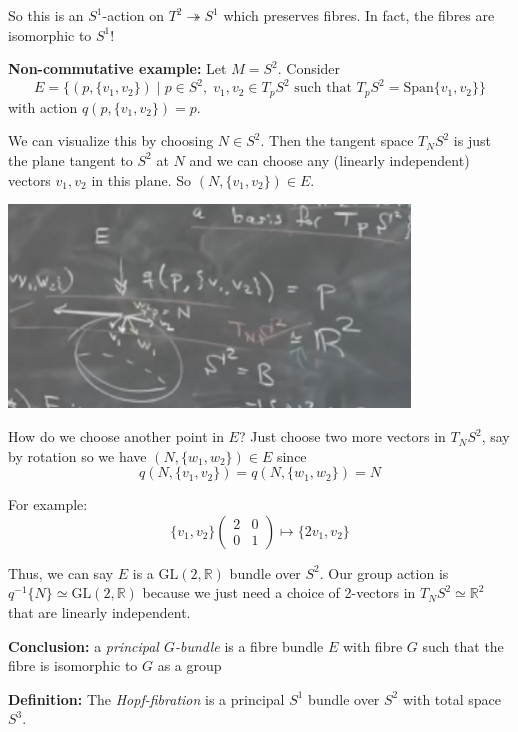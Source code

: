 \documentclass[12pt]{article}
\newcommand{\R}{\mathbb{R}}
\newcommand{\GL}{\text{GL}}
\begin{document}
    So this is an $S^1$-action on $T^2 \twoheadrightarrow S^1$ which preserves fibres. In fact, the fibres are isomorphic to $S^1$! 

    \textbf{Non-commutative example:} Let $M = S^2$. Consider 
    \[E = \{(p, \{v_1, v_2\}) \; | \; p \in S^2, \; v_1, v_2 \in T_p S^2 \text{ such that } T_p S^2 = \text{Span}\{v_1, v_2\}\}\] 
    with action $q(p, \{v_1, v_2\}) = p$. 

    We can visualize this by choosing $N \in S^2$. Then the tangent space $T_NS^2$ is just the plane tangent to $S^2$ at $N$ and we can choose any (linearly independent) vectors $v_1, v_2$ in this plane. So $(N, \{v_1, v_2\}) \in E$. 


    \begin{center}
        \includegraphics[width=0.8\textwidth]{Images/April 17 - Noncommutative manifold}
    \end{center}

    How do we choose another point in $E$? Just choose two more vectors in $T_{N}S^2$, say by rotation so we have $(N, \{w_1, w_2\}) \in E$ since 
    \[q(N, \{v_1, v_2\}) = q(N, \{w_1, w_2\}) = N\]
    
    For example: 
    \[\{v_1, v_2\} \begin{pmatrix}
        2 & 0\\ 
        0 & 1
    \end{pmatrix} \mapsto \{2v_1, v_2\}\] 

    Thus, we can say $E$ is a $\GL(2, \R)$ bundle over $S^2$. Our group action is $q^{-1}\{N\} \simeq \GL(2, \R)$ because we just need a choice of 2-vectors in $T_N S^2 \simeq \R^2$ that are linearly independent. 

    \textbf{Conclusion:} a \emph{principal $G$-bundle} is a fibre bundle $E$ with fibre $G$ such that the fibre is isomorphic to $G$ as a group 

    \textbf{Definition:} The \emph{Hopf-fibration} is a principal $S^1$ bundle over $S^2$ with total space $S^3$. 
\end{document}
